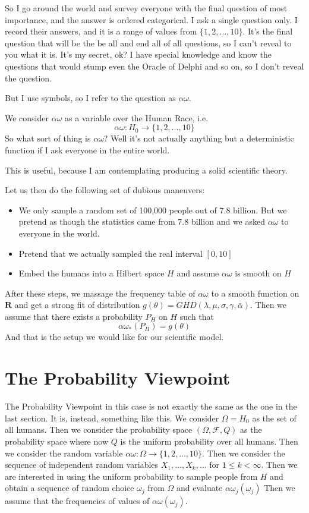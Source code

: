 \documentclass{amsart}
\begin{document}
So I go around the world and survey everyone with the final question of most importance, and the answer is ordered categorical.  I ask a single question only.  I record their answers, and it is a range of values from $\{ 1,2,\dots, 10 \}$.  It's the final question that will be the be all and end all of all questions, so I can't reveal to you what it is.  It's my secret, ok?  I have special knowledge and know the questions that would stump even the Oracle of Delphi and so on, so I don't reveal the question.  

But I use symbols, so I refer to the question as $\alpha \omega$.  

We consider $\alpha \omega$ as a variable over the Human Race, i.e.
\[
\alpha \omega: H_0 \rightarrow \{1,2,\dots, 10\}
\]
So what sort of thing is $\alpha \omega$?  Well it's not actually anything but a deterministic function if I ask everyone in the entire world.

This is useful, because I am contemplating producing a solid scientific theory.

Let us then do the following set of dubious maneuvers:
\begin{itemize}
\item{We only sample a random set of 100,000 people out of 7.8 billion.  But we pretend as though the statistics came from 7.8 billion and we asked $\alpha \omega$ to everyone in the world.}
\item{Pretend that we actually sampled the real interval $[0,10]$ }
\item{ Embed the humans into a Hilbert space $H$ and assume $\alpha \omega$ is smooth on $H$}
\end{itemize}

After these steps, we massage the frequency table of $\alpha \omega$ to a smooth function on $\mathbf{R}$ and get a strong fit of distribution $g(\theta) = GHD(\lambda,\mu,\sigma, \gamma,\bar{\alpha})$.  Then we assume that there exists a probability $P_H$ on $H$ such that 
\[
\alpha \omega_*(P_H) = 
g(\theta)
\]
And that is the setup we would like for our scientific model.

\section{The Probability Viewpoint}

The Probability Viewpoint in this case is not exactly the same as the one in the last section.  It is, instead, something like this.  We consider $\Omega=H_0$ as the set of all humans.  Then we consider the probability space $(\Omega,\mathcal{F},Q)$ as the probability space where now $Q$ is the uniform probability over all humans.  Then we consider the random variable $\alpha \omega:\Omega \rightarrow \{1,2,\dots,10 \}$.  Then we consider the sequence of independent random variables $X_1, \dots, X_k, \dots$  for $1\le k < \infty$.  Then we are interested in using the uniform probability to sample people from $H$ and obtain a sequence of random choice $\omega_j$ from $\Omega$ and evaluate 
$\alpha \omega_j(\omega_j)$  
Then we assume that the frequencies of values of $\alpha \omega( \omega_j )$.
\end{document}
